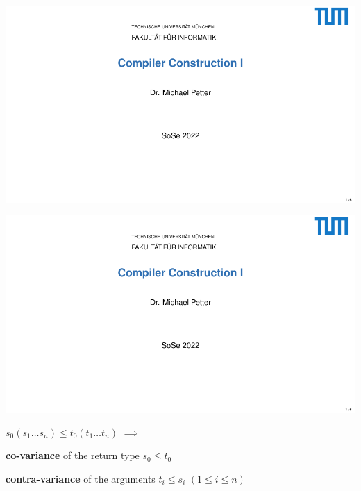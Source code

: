 \documentclass[10pt, landscape]{article}
\theoremstyle{definition}
\begin{document}
\begin{multicols*}{3}
\includegraphics[page=238, width=\columnwidth, trim= 3cm .5cm 3cm 5cm, clip]{./selfservice-handout.pdf}

\includegraphics[page=239, width=\columnwidth, trim= 4cm 6cm 4cm 1cm, clip]{./selfservice-handout.pdf}

\begin{center} $s_{0} (s_{1} \dots s_{n}) \le t_{0} (t_{1} \dots t_{n})$ $\implies$ \end{center}
\begin{compactenum}
  \item \textbf{co-variance} of the return type $s_{0} \le t_{0}$
  \item \textbf{contra-variance} of the arguments $t_{i} \le s_{i}$ $(1 \le i \le n)$
\end{compactenum}

\end{multicols*}
\end{document}
